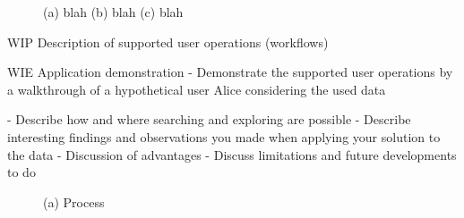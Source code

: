 \documentclass[runningheads]{llncs}
\begin{document}
\begin{figure}
    \centering
    \caption{(a) blah (b) blah (c) blah}
    \label{fig:foobar}
\end{figure}




WIP
Description of supported user operations (workflows)

WIE
Application demonstration
- Demonstrate the supported user operations by a walkthrough of a hypothetical
user Alice considering the used data

- Describe how and where searching and exploring are possible
- Describe interesting findings and observations you made when applying your solution to the data
- Discussion of advantages
- Discuss limitations and future developments to do
           


\begin{figure}
    \centering
    \caption{(a) Process}
    \label{fig:process}
\end{figure}
\end{document}
